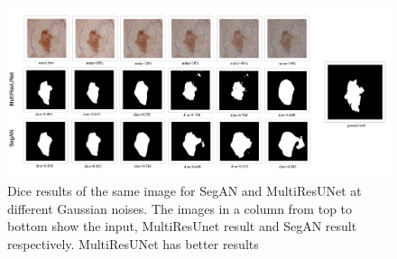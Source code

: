 \begin{figure}
    \centerline{\includegraphics[width=1\columnwidth]{05-results/figures/extended_results_sample_unet_over_gan.png}}
    \caption{Dice results of the same image for SegAN and MultiResUNet at different Gaussian noises. The images in a column from top to bottom show the input, MultiResUnet result and SegAN result respectively. MultiResUNet has better results}
    \label{fig:all-noises-with-results-dice-multiresunet-over-segan}
\end{figure}

